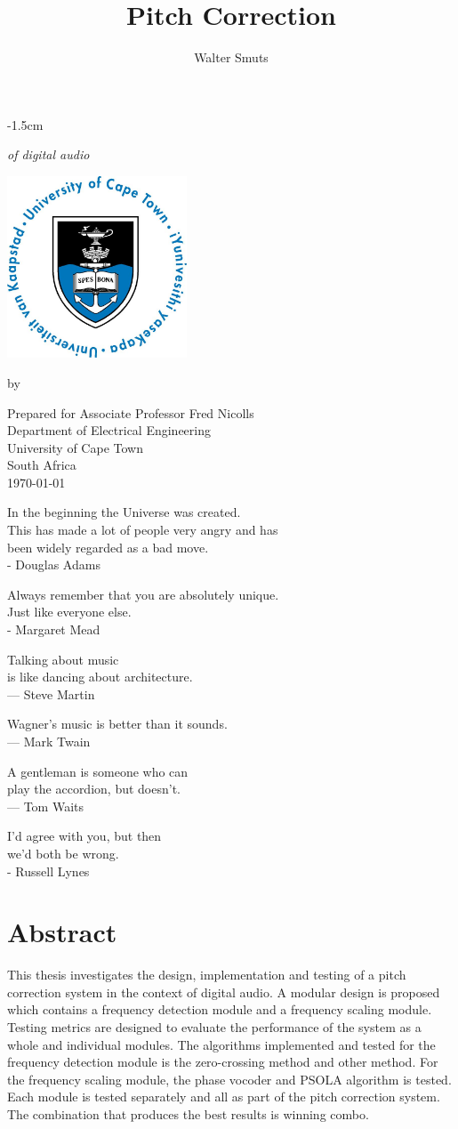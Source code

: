 \documentclass[12pt, twoside, openright]{report}
\title{Pitch Correction}
\author{Walter Smuts}
\makeatletter
\newcounter{quoteCounter}
\newcommand\addQuote{
\begin{center}

	\ifnum\thequoteCounter=1
		In the beginning the Universe was created.\\
		This has made a lot of people very angry and has\\
		been widely regarded as a bad move.\\
		\vspace{1cm}
		- Douglas Adams
	\fi

	\ifnum\thequoteCounter=2
		Always remember that you are absolutely unique.\\
		Just like everyone else.\\
		\vspace{1cm}
		- Margaret Mead
	\fi

	\ifnum\thequoteCounter=3
		Talking about music\\
		is like dancing about architecture.\\
		\vspace{1cm}
		 — Steve Martin
	\fi


	\ifnum\thequoteCounter=4
		Wagner’s music is better than it sounds.\\
		\vspace{1cm}
		— Mark Twain
	\fi

	\ifnum\thequoteCounter=5
		A gentleman is someone who can\\
		play the accordion,
		but doesn't.\\
		\vspace{1cm}
		— Tom Waits
	\fi

	\ifnum\thequoteCounter=6
		I'd agree with you, but then\\
		we'd both be wrong.\\
		\vspace{1cm}
		- Russell Lynes
	\fi

	\stepcounter{quoteCounter}

	\ifnum\thequoteCounter=7
		\setcounter{quoteCounter}{1}
	\fi

\end{center}

}
\newcommand{\frontpageoffset}{-1.5cm}
\newcommand{\frontpageoffset}{0cm}
\def\cleardoublepage{\clearpage\if@twoside \ifodd\c@page\else
\hbox{}
\vspace*{\fill}
\begin{center}
	\it \addQuote
\end{center}
\vspace{\fill}
\thispagestyle{empty}
\newpage
\if@twocolumn\hbox{}\newpage\fi\fi\fi}
\makeatother
\begin{document}
\makeatletter
\let\TITLE\@title
\makeatother

\begin{titlepage}
\begin{adjustwidth*}{}{\frontpageoffset} %
\begin{center}
	\vspace*{4cm}

	{\Huge\textbf\thetitle}

	{\it of digital audio}

	\vspace{0.8cm}
	\includegraphics[width=0.4\textwidth]{UCT.jpg}
	\vspace{0.8cm}

	by \theauthor
	\vspace{0.8cm}

	Prepared for Associate Professor Fred Nicolls\\
	Department of Electrical Engineering\\
	University of Cape Town\\
	South Africa\\
	\vspace{2cm}
	\today
\end{center}
\end{adjustwidth*}
\end{titlepage}
\cleardoublepage

\setcounter{page}{1}

\null
\vfill

\section*{\center Abstract}
\thispagestyle{plain}

This thesis investigates the design, implementation and testing of a pitch
correction system in the context of digital audio. A modular design is proposed
which contains a frequency detection module and a frequency scaling module.
Testing metrics are designed to evaluate the performance of the system as a whole
and individual modules. The algorithms implemented and tested for the frequency
detection module is the zero-crossing method and \color{red} other
method\color{black}. For the frequency scaling module, the phase vocoder and PSOLA
algorithm is tested.  Each module is tested separately and all as part of the
pitch correction system.  The combination that produces the best results is
\color{red}winning combo\color{black}.
\end{document}
